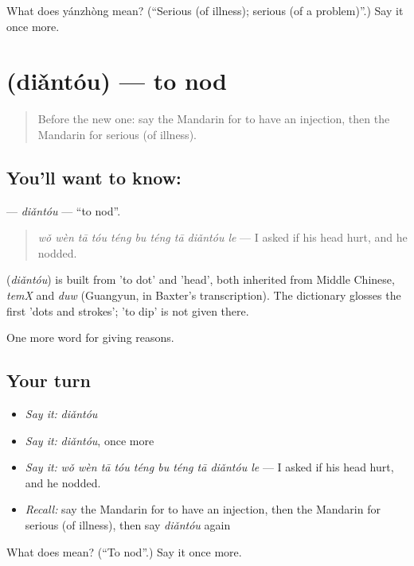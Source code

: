 \begin{tcolorbox}[breakable,colback=teal!4,colframe=teal!35!black,title={Before you move on}]
What does yánzhòng mean? (\textquotedblleft{}Serious (of illness); serious (of a problem)\textquotedblright{}.) Say it once more.
\end{tcolorbox}
\section[\texorpdfstring{\zh{点头} (diǎntóu)}{点头 (diǎntóu)}]{ (diǎntóu) — to nod}

\label{lesson:ZH-C228-diantou}



\begin{quote}
Before the new one: say the Mandarin for to have an injection, then the Mandarin for serious (of illness).
\end{quote}

\subsection*{You'll want to know: }
\textbf{} — \emph{diǎntóu} — \textquotedblleft{}to nod\textquotedblright{}.

\begin{quote}
\textbf{} \emph{wǒ wèn tā tóu téng bu téng tā diǎntóu le} — I asked if his head hurt, and he nodded.
\end{quote}

\begin{cousinweb}
\textbf{} (\emph{diǎntóu}) is built from  'to dot' and  'head', both inherited from Middle Chinese, \emph{temX} and \emph{duw} (Guangyun, in Baxter's transcription). The dictionary glosses the first 'dots and strokes'; 'to dip' is not given there.
\end{cousinweb}

\begin{grammarlens}[title={What you've built}]
One more word for giving reasons.
\end{grammarlens}

\subsection*{Your turn}
\begin{itemize}
\raggedright
  \item \emph{Say it:} \emph{diǎntóu}
  \item \emph{Say it:} \emph{diǎntóu}, once more
  \item \emph{Say it:} \emph{wǒ wèn tā tóu téng bu téng tā diǎntóu le} — I asked if his head hurt, and he nodded.
  \item \emph{Recall:} say the Mandarin for to have an injection, then the Mandarin for serious (of illness), then say \emph{diǎntóu} again
\end{itemize}

\begin{tcolorbox}[breakable,colback=teal!4,colframe=teal!35!black,title={Before you move on}]
What does  mean? (\textquotedblleft{}To nod\textquotedblright{}.) Say it once more.
\end{tcolorbox}
